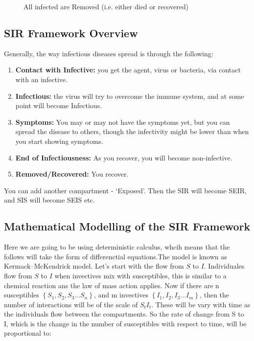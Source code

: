 \documentclass[fontsize=17pt]{article}
\begin{document}
\begin{figure}
	\begin{center}
	\end{center}
	
	\caption{All infected are Removed (i.e. either died or recovered)}
	\label{fig: end_removed}
\end{figure}

\subsection{SIR Framework Overview}

Generally, the way infectious diseases spread is through the following:
\begin{enumerate}
	\item \textbf{Contact with Infective: }you get the agent, virus or bacteria, via contact with an infective. 
	\item \textbf{Infectious: }the virus will try to overcome the immune system, and at some point will become Infectious. 
	\item \textbf{Symptoms: }You may or may not have the symptoms yet, but you can spread the disease to others, though the infectivity might be lower than when you start showing symptoms.
	\item \textbf{End of Infectiousness: }As you recover, you will become non-infective.
	\item \textbf{Removed/Recovered: }You recover.
\end{enumerate}
You can add another compartment - `Exposed'. Then the SIR will become SEIR, and SIS will become SEIS etc.

\subsection{Mathematical Modelling of the SIR Framework}

Here we are going to be using deterministic calculus, whcih means that the follows will take the form of differenctial equations.The model is known as Kermack–McKendrick model. Let's start with the flow from $S$ to $I$. Individuales flow from $S$ to $I$ when invectives mix with susceptibles, this is similar to a chemical reaction ans the law of mass action applies. Now if there are n susceptibles $\left\lbrace S_{1}, S_{2}, S_{3}... S_{n} \right\rbrace$, and m invectives $\left\lbrace I_{1}, I_{2}, I_{3}... I_{m} \right\rbrace$, then the number of interactions will be of the scale of $S_{t}I_{t}$. These will be vary with time as the individuals flow between the compartments. So the rate of change from S to I, which is the change in the number of susceptibles with respect to time, will be proportional to:
\end{document}
